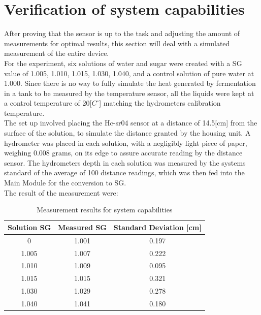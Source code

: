 \documentclass[twoside]{ctuthesis}
\theoremstyle{plain}
\theoremstyle{definition}
\theoremstyle{note}
\begin{document}
\section{Verification of system capabilities}
After proving that the sensor is up to the task and adjusting the amount of measurements for optimal results, this section will deal with a simulated measurement of the entire device.\\
For the experiment, six solutions of water and sugar were created with a SG value of 1.005, 1.010, 1.015, 1.030, 1.040, and a control solution of pure water at 1.000. Since there is no way to fully simulate the heat generated by fermentation in a tank to be measured by the temperature sensor, all the liquids were kept at a control temperature of 20[$C^\circ$] matching the hydrometers calibration temperature.\\
The set up involved placing the Hc-sr04 sensor at a distance of 14.5[cm] from the surface of the solution, to simulate the distance granted by the housing unit.
A hydrometer was placed in each solution, with a negligibly light piece of paper, weighing 0.008 grams, on its edge to assure accurate reading by the distance sensor. The hydrometers depth in each solution was measured by the systems standard of the average of 100 distance readings, which was then fed into the Main Module for the conversion to SG.\\
The result of the measurement were:

\begin{table}[H]
	\centering
	\begin{tabular}{| c |c| c |}
		\hline
		Solution SG & Measured SG & Standard Deviation [cm]\\ \hline
		0 & 1.001 & 0.197\\
		1.005 & 1.007 & 0.222\\
		1.010 & 1.009 & 0.095\\
		1.015 & 1.015 & 0.321\\
		1.030 & 1.029 & 0.278\\
		1.040 & 1.041 & 0.180\\
	
		\hline
	\end{tabular}
	\caption{Measurement results for system capabilities}
\end{table}
\end{document}
